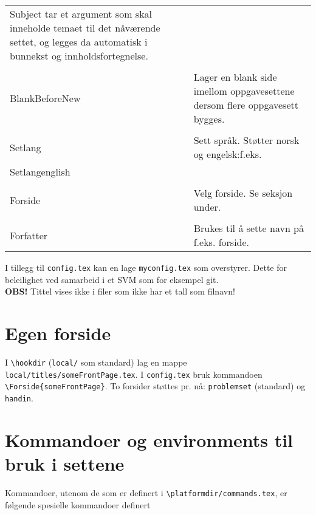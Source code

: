 \documentclass{article}
\def\platformdir{.}
\begin{document}
\begin{tabularx}{\textwidth}{lX}
												Subject tar et argument som skal inneholde temaet til det nåværende settet, og legges da automatisk i bunnekst og innholdsfortegnelse.\\
	\lstinline{\\BlankBeforeNew}&Lager en blank side imellom oppgavesettene dersom flere oppgavesett bygges.\\
	\lstinline{\\Setlang}&Sett språk. Støtter norsk og engelsk:f.eks. \lstinline{\\Setlang{english}}. Norsk er standard.\\
	\lstinline{\\Forside}&Velg forside. Se seksjon under.\\
	\lstinline{\\Forfatter}&Brukes til å sette navn på f.eks. forside.

\end{tabularx}
I tillegg til \lstinline{config.tex} kan en lage \lstinline{myconfig.tex} som overstyrer. Dette for beleilighet ved samarbeid i et SVM som for eksempel git.\\
\textbf{OBS!} Tittel vises ikke i filer som ikke har et tall som filnavn!
\clearpage
\section*{Egen forside}
I \lstinline{\hookdir} (\lstinline{local/} som standard) lag en mappe \lstinline{local/titles/someFrontPage.tex}.
I \lstinline{config.tex} bruk kommandoen \lstinline|\Forside{someFrontPage}|.
To forsider støttes pr. nå: \lstinline{problemset} (standard) og \lstinline{handin}.
\section*{Kommandoer og environments til bruk i settene}

Kommandoer, utenom de som er definert i \lstinline{\platformdir/commands.tex}, er følgende spesielle kommandoer definert\\
\end{document}
